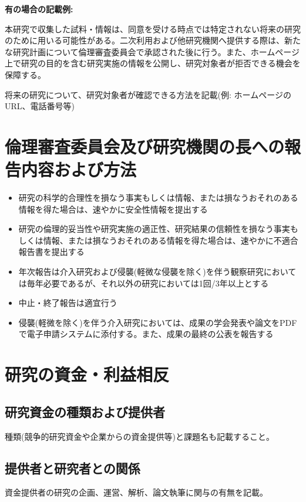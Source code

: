 \documentclass{kyodai-protocol}
\begin{document}
\textbf{有の場合の記載例:}

本研究で収集した試料・情報は、同意を受ける時点では特定されない将来の研究のために用いる可能性がある。二次利用および他研究機関へ提供する際は、新たな研究計画について倫理審査委員会で承認された後に行う。また、ホームページ上で研究の目的を含む研究実施の情報を公開し、研究対象者が拒否できる機会を保障する。

将来の研究について、研究対象者が確認できる方法を記載(例: ホームページのURL、電話番号等)

\section{倫理審査委員会及び研究機関の長への報告内容および方法}
\label{sec:reporting}

\begin{itemize}
\item 研究の科学的合理性を損なう事実もしくは情報、または損なうおそれのある情報を得た場合は、速やかに安全性情報を提出する
\item 研究の倫理的妥当性や研究実施の適正性、研究結果の信頼性を損なう事実もしくは情報、または損なうおそれのある情報を得た場合は、速やかに不適合報告書を提出する
\item 年次報告は介入研究および侵襲(軽微な侵襲を除く)を伴う観察研究においては毎年必要であるが、それ以外の研究においては1回/3年以上とする
\item 中止・終了報告は適宜行う
\item 侵襲(軽微を除く)を伴う介入研究においては、成果の学会発表や論文をPDFで電子申請システムに添付する。また、成果の最終の公表を報告する
\end{itemize}

\section{研究の資金・利益相反}
\label{sec:funding-coi}

\subsection{研究資金の種類および提供者}

種類(競争的研究資金や企業からの資金提供等)と課題名も記載すること。

\subsection{提供者と研究者との関係}

資金提供者の研究の企画、運営、解析、論文執筆に関与の有無を記載。
\end{document}
